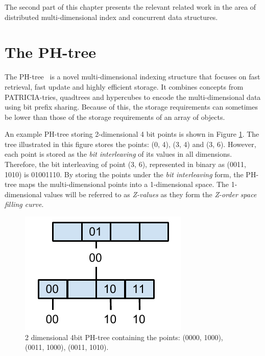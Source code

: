 \documentclass[11pt,a4paper]{globis-book}
\begin{document}
The second part of this chapter presents the relevant related work in the area of distributed multi-dimensional index and concurrent data structures. 

\section{The PH-tree}
\label{sec:background-phtree}

The PH-tree~\cite{Zaschke2014} is a novel multi-dimensional indexing structure that focuses on fast retrieval, fast update and highly efficient storage. It combines concepts from PATRICIA-tries, quadtrees and hypercubes to encode the multi-dimensional data using bit prefix sharing. Because of this, the storage requirements can sometimes be lower than those of the storage requirements of an array of objects.

An example PH-tree storing 2-dimensional 4 bit points is shown in Figure \ref{fig:PhTree-example}. The tree illustrated in this figure stores the points: (0, 4), (3, 4) and (3, 6). However, each point is stored as the \textit{bit interleaving} of its values in all dimensions. Therefore, the bit interleaving of point (3, 6), represented in binary as (0011, 1010) is 01001110. By storing the points under the \textit{bit interleaving} form, the PH-tree maps the multi-dimensional points into a 1-dimensional space. The 1-dimensional values will be referred to as \textit{Z-values} as they form the \textit{Z-order space filling curve}. 

\begin{figure}[h]
    \centering 
    \includegraphics{images/PhTree-example}
    \caption{2 dimensional 4bit PH-tree containing the points: (0000, 1000), (0011, 1000), (0011, 1010).}
    \label{fig:PhTree-example}
\end{figure}
\end{document}
